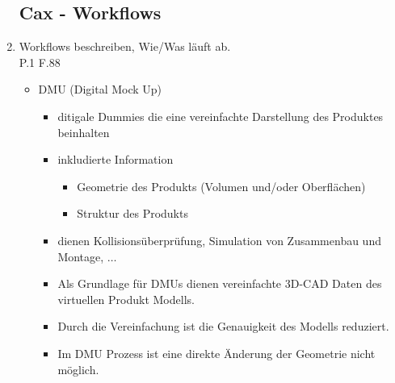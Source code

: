 \documentclass[10pt,a4paper,fleqn]{article}
\begin{document}
\begin{enumerate}
\subsection{Cax - Workflows}
	\item Workflows beschreiben, Wie/Was läuft ab.\\
		P.1 F.88
			\begin{itemize}
				\item DMU (Digital Mock Up)
					\begin{itemize}
						\item ditigale Dummies die eine vereinfachte Darstellung des Produktes beinhalten
						\item inkludierte Information
							\begin{itemize}
								\item Geometrie des Produkts (Volumen und/oder Oberflächen)
								\item Struktur des Produkts
							\end{itemize}
						\item dienen Kollisionsüberprüfung, Simulation von Zusammenbau und Montage, $\dots$
						\item Als Grundlage für DMUs dienen vereinfachte 3D-CAD Daten des virtuellen Produkt Modells.
						\item Durch die Vereinfachung ist die Genauigkeit des Modells reduziert.
						\item Im DMU Prozess ist eine direkte Änderung der Geometrie nicht möglich.
						

\end{itemize}
\end{itemize}
\end{enumerate}
\end{document}
